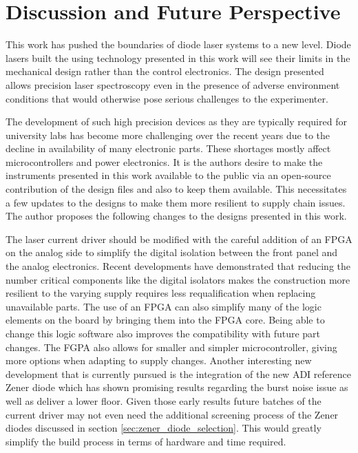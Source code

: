 \chapter{Discussion and Future Perspective}%
\label{sec:outlook}
This work has pushed the boundaries of diode laser systems to a new level. Diode lasers built the using technology presented in this work will see their limits in the mechanical design rather than the control electronics. The design presented allows precision laser spectroscopy even in the presence of adverse environment conditions that would otherwise pose serious challenges to the experimenter.

The development of such high precision devices as they are typically required for university labs has become more challenging over the recent years due to the decline in availability of many electronic parts. These shortages mostly affect microcontrollers and power electronics. It is the authors desire to make the instruments presented in this work available to the public via an open-source contribution of the design files and also to keep them available. This necessitates a few updates to the designs to make them more resilient to supply chain issues. The author proposes the following changes to the designs presented in this work.

The  laser current driver should be modified with the careful addition of an FPGA on the analog side to simplify the digital isolation between the front panel and the analog electronics. Recent developments have demonstrated that reducing the number critical components like the digital isolators makes the construction more resilient to the varying supply requires less requalification when replacing unavailable parts. The use of an FPGA can also simplify many of the logic elements on the board by bringing them into the FPGA core. Being able to change this logic software also improves the compatibility with future part changes. The FGPA also allows for smaller and simpler microcontroller, giving more options when adapting to supply changes. Another interesting new development that is currently pursued is the integration of the new ADI  reference Zener diode which has shown promising results regarding the burst noise issue as well as deliver a lower floor. Given those early results future batches of the current driver may not even need the additional screening process of the Zener diodes discussed in section \ref{sec:zener_diode_selection}. This would greatly simplify the build process in terms of hardware and time required.

